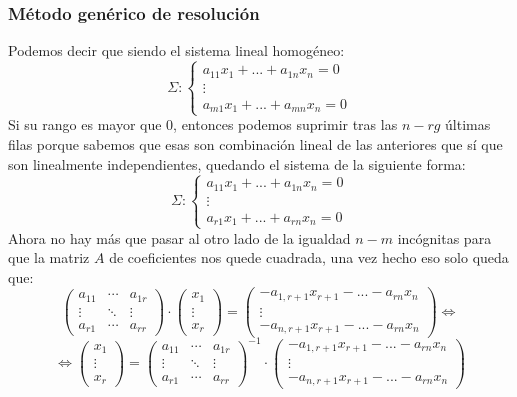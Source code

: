 \documentclass[10pt,a4paper,openright]{book}
\begin{document}
\subsubsection*{Método genérico de resolución}
Podemos decir que siendo el sistema lineal homogéneo:
$$\Sigma: \begin{cases}a_{11} x_1+...+a_{1n}x_n=0 \\ \vdots \\ a_{m1}x_1+...+a_{mn}x_n=0\end{cases}$$
Si su rango es mayor que 0, entonces podemos suprimir tras las $n-rg$ últimas filas porque sabemos que esas son combinación lineal de las anteriores que sí que son linealmente independientes, quedando el sistema de la siguiente forma:
$$\Sigma: \begin{cases}a_{11} x_1+...+a_{1n}x_n=0 \\ \vdots \\ a_{r1}x_1+...+a_{rn}x_n=0\end{cases}$$
Ahora no hay más que pasar al otro lado de la igualdad $n-m$ incógnitas para que la matriz $A$ de coeficientes nos quede cuadrada, una vez hecho eso solo queda que:
$$\begin{pmatrix}
a_{11} &\cdots & a_{1r} \\ \vdots & \ddots & \vdots \\ a_{r1}  & \cdots & a_{rr}\end{pmatrix} \cdot \begin{pmatrix}
x_1 \\ \vdots \\ x_r
\end{pmatrix}=\begin{pmatrix}
-a_{1,r+1}x_{r+1}-...-a_{rn}x_n \\ \vdots \\ -a_{n,r+1}x_{r+1}-...-a_{rn}x_n
\end{pmatrix}\Leftrightarrow $$
$$\Leftrightarrow \begin{pmatrix}
x_1 \\ \vdots \\ x_r
\end{pmatrix}=\begin{pmatrix}
a_{11} &\cdots & a_{1r} \\ \vdots & \ddots & \vdots \\ a_{r1}  & \cdots & a_{rr}\end{pmatrix}^{-1} \cdot \begin{pmatrix}
-a_{1,r+1}x_{r+1}-...-a_{rn}x_n \\ \vdots \\ -a_{n,r+1}x_{r+1}-...-a_{rn}x_n
\end{pmatrix}$$
\end{document}
